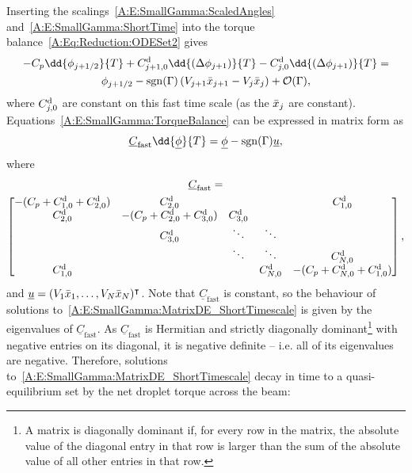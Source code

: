 \begin{subappendices}
Inserting the scalings~\eqref{A:E:SmallGamma:ScaledAngles} and~\eqref{A:E:SmallGamma:ShortTime} into the torque balance~\eqref{A:Eq:Reduction:ODESet2} gives
\begin{multline}\label{A:E:SmallGamma:TorqueBalance}
-C_p\dd{\angl_{j+1/2}}{T} +\viscdamp_{j+1,0}\dd{(\dangl_{j+1})}{T} -\viscdamp_{j,0}\dd{(\dangl_{j+1})}{T} =\\ \angl_{j+1/2} - \sgn(\Gamma)\left(V_{j+1} \xbar_{j+1}  - V_j \xbar_j\right)+\mathcal{O}(\Gamma),
\end{multline}
where $C^{\text{d}}_{j,0}$ are constant on this fast time scale (as the $\bar{x}_j$ are constant). Equations~\eqref{A:E:SmallGamma:TorqueBalance} can be expressed in matrix form as
\begin{equation}\label{A:E:SmallGamma:MatrixDE_ShortTimescale}
\underline{C}_{\text{fast}}\dd{\underline{\phi}}{T} = \underline{\phi} -  \sgn(\Gamma) \underline{u},
\end{equation}
where
\begin{multline*}\label{A:E:SmallGamma:ViscousDampingMatrix}
\underline{C}_\text{fast} =\\  \begin{bmatrix}
-(C_p+C^{\text{d}}_{1,0} +C^{\text{d}}_{2,0}) & C^{\text{d}}_{2,0}   & & & C^{\text{d}}_{1,0} \\
C^{\text{d}}_{2,0} & -(C_p+C^{\text{d}}_{2,0} +C^{\text{d}}_{3,0}) & C^{\text{d}}_{3,0}  \\
 & C^{\text{d}}_{3,0} & \ddots & \ddots \\
& & \ddots & \ddots & C^{\text{d}}_{N,0} \\
C^{\text{d}}_{1,0}& & &C^{\text{d}}_{N,0}&- (C_p+C^{\text{d}}_{N,0} +C^{\text{d}}_{1,0})
\end{bmatrix},
\end{multline*} and $\underline{u} = (V_1\bar{x}_1,\dots, V_N\bar{x}_N)^\intercal$. Note that $\underline{C}_\text{fast}$ is constant, so the behaviour of solutions to~\eqref{A:E:SmallGamma:MatrixDE_ShortTimescale} is given by the eigenvalues of $\underline{C}_\text{fast}$. As $\underline{C}_\text{fast}$ is Hermitian and strictly diagonally dominant\footnote{A matrix is diagonally dominant if, for every row in the matrix, the absolute value of the diagonal entry in that row is larger than the sum of the absolute value of all other entries in that row.} with negative entries on its diagonal, it is negative definite -- i.e. all of its eigenvalues are negative. Therefore, solutions to~\eqref{A:E:SmallGamma:MatrixDE_ShortTimescale} decay in time to a quasi-equilibrium set by the net droplet torque across the beam:

\end{subappendices}
